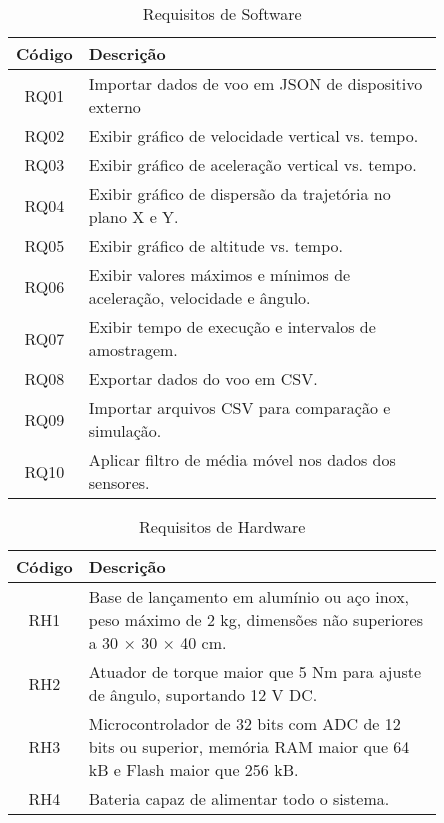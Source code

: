 \begin{table}[htpb]
\centering
\scriptsize %
\setlength{\tabcolsep}{4pt} %
\caption{Requisitos de Software} %
\begin{tabular}{|c|p{0.85\linewidth}|}
\hline
\textbf{Código} & \textbf{Descrição} \\
\hline
RQ01 & Importar dados de voo em JSON de dispositivo externo \\
\hline
RQ02 & Exibir gráfico de velocidade vertical vs. tempo. \\
\hline
RQ03 & Exibir gráfico de aceleração vertical vs. tempo. \\
\hline
RQ04 & Exibir gráfico de dispersão da trajetória no plano X e Y. \\
\hline
RQ05 & Exibir gráfico de altitude vs. tempo. \\
\hline
RQ06 & Exibir valores máximos e mínimos de aceleração, velocidade e ângulo. \\
\hline
RQ07 & Exibir tempo de execução e intervalos de amostragem. \\
\hline
RQ08 & Exportar dados do voo em CSV. \\
\hline
RQ09 & Importar arquivos CSV para comparação e simulação. \\
\hline
RQ10 & Aplicar filtro de média móvel nos dados dos sensores. \\
\hline
\end{tabular}
\label{tab:requisitos_detalhados} %
\end{table}


\begin{table}[htpb]
\centering
\scriptsize
\setlength{\tabcolsep}{4pt}
\caption{Requisitos de Hardware}
\begin{tabular}{|c|p{0.85\linewidth}|}
\hline
\textbf{Código} & \textbf{Descrição} \\
\hline
RH1 & Base de lançamento em alumínio ou aço inox, peso máximo de 2 kg, dimensões não superiores a 30 × 30 × 40 cm. \\
\hline
RH2 & Atuador de torque maior que 5 Nm para ajuste de ângulo, suportando 12 V DC. \\
\hline
RH3 & Microcontrolador de 32 bits com ADC de 12 bits ou superior, memória RAM maior que 64 kB e Flash maior que 256 kB. \\
\hline
RH4 & Bateria capaz de alimentar todo o sistema. \\
\hline
\end{tabular}
\label{tab:requisitos-hardware}
\end{table}

